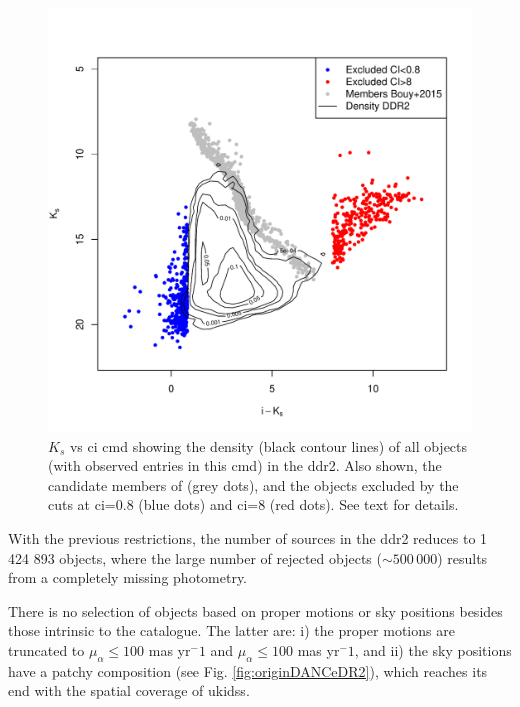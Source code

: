 \begin{figure}[ht!]
\begin{center}
\includegraphics[width=\textwidth]{background/Figures/ColourCuts.pdf}
\caption{$K_s$ vs \gls{ci} \gls{cmd} showing the density (black contour lines) of all objects (with observed entries in this \gls{cmd}) in the \gls{ddr2}. Also shown, the candidate members of \citet{Bouy2015} (grey dots), and the objects excluded by the cuts at \gls{ci}=0.8 (blue dots) and \gls{ci}=8 (red dots). See text for details.}
\label{fig:incompatible_objects}
\end{center}
\end{figure}

With the previous restrictions, the number of sources in the \gls{ddr2} reduces to 1 424 893 objects, where the large number of rejected objects ($\sim 500\, 000$) results from a completely missing photometry.

There is no selection of objects based on proper motions or sky positions besides those intrinsic to the catalogue. The latter are: i) the proper motions are truncated to $\mu_{\alpha} \leq 100$ mas yr$^-1$ and $\mu_{\alpha} \leq 100$ mas yr$^-1$, and ii) the sky positions have a patchy composition (see Fig. \ref{fig:originDANCeDR2}), which reaches its end with the spatial coverage of \gls{ukidss}.

